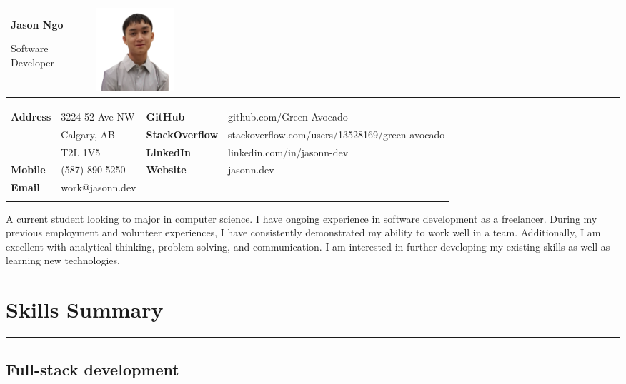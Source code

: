 \documentclass[letterpaper]{article}
\begin{document}
    \begin{tabular}{p{} >{\raggedleft\arraybackslash}m{}}
        {\Huge
        \textbf{Jason Ngo}}

        {\large
        Software Developer}
        &
        \includegraphics[width=0.15\textwidth]{../resources/pfp.png}
    \end{tabular}

    {\small%
        \renewcommand{\arraystretch}{1.5}
        \begin{tabular}{p{} p{} p{} p{}}
            \\
            \textbf{Address} & 3224 52 Ave NW & \textbf{GitHub} & github.com/Green-Avocado \\
            & Calgary, AB & \textbf{StackOverflow} & stackoverflow.com/users/13528169/green-avocado \\
            & T2L 1V5 & \textbf{LinkedIn} & linkedin.com/in/jasonn-dev \\
            \textbf{Mobile} & (587) 890-5250 & \textbf{Website} & jasonn.dev \\
            \textbf{Email} & work@jasonn.dev \\
            \\
        \end{tabular}
    }

    A current student looking to major in computer science.
    I have ongoing experience in software development as a freelancer.
    During my previous employment and volunteer experiences, I have consistently demonstrated my ability to work well in a team.
    Additionally, I am excellent with analytical thinking, problem solving, and communication.
    I am interested in further developing my existing skills as well as learning new technologies.

    \section*{Skills Summary}

        \rule{\textwidth}{0.2pt}

        \subsection*{Full-stack development}
\end{document}
